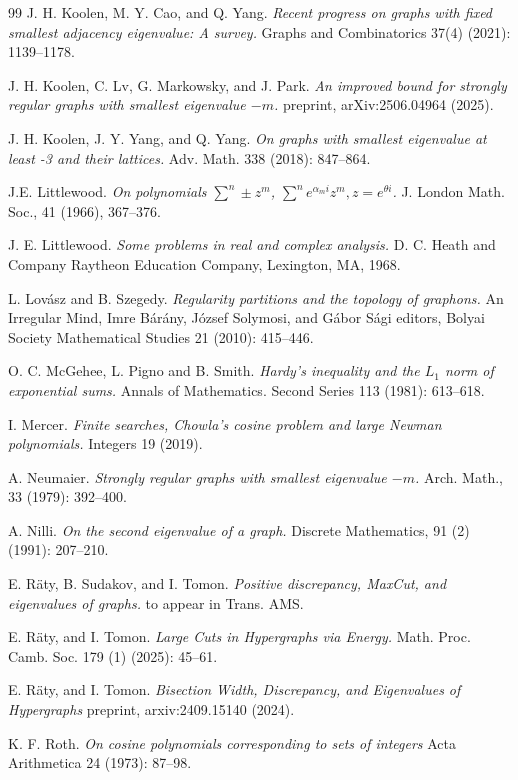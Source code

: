 \documentclass[11pt]{article}
\theoremstyle{plain}
\theoremstyle{definition}
\begin{document}
\begin{thebibliography}{99}
J. H. Koolen, M. Y. Cao, and Q. Yang.
\emph{Recent progress on graphs with fixed smallest adjacency eigenvalue: A survey.}
Graphs and Combinatorics 37(4) (2021): 1139--1178.

J. H. Koolen, C. Lv, G. Markowsky, and J. Park.
\emph{An improved bound for strongly regular graphs with smallest eigenvalue $-m$.} preprint, arXiv:2506.04964 (2025).

J. H. Koolen, J. Y. Yang, and Q. Yang.
\emph{On graphs with smallest eigenvalue at least -3 and their lattices.}
Adv. Math. 338 (2018): 847--864.

J.E. Littlewood.
\emph{On polynomials $\sum^n \pm z^m$, $\sum^n e^{\alpha_m i}z^m, z=e^{\theta i}$.}
J. London Math. Soc., 41 (1966), 367--376.

J. E. Littlewood.
\emph{Some problems in real and complex analysis.} 
D. C. Heath and Company Raytheon Education Company, Lexington, MA, 1968.

L. Lov\'asz and B. Szegedy.
\emph{Regularity partitions and the topology of graphons.}
An Irregular Mind, Imre B\'ar\'any, J\'ozsef Solymosi, and G\'abor S\'agi editors, Bolyai Society Mathematical Studies 21 (2010): 415--446.

O. C. McGehee, L. Pigno and B. Smith.
\emph{Hardy's inequality and the $L_1$ norm of exponential sums.}
Annals of Mathematics. Second Series 113 (1981): 613--618.

I. Mercer. 
\emph{Finite searches, Chowla's cosine problem and large Newman polynomials.}
Integers 19 (2019).

 A. Neumaier. 
\emph{Strongly regular graphs with smallest eigenvalue $-m$.} 
Arch. Math., 33 (1979): 392--400.

A. Nilli.
\emph{On the second eigenvalue of a graph.}
Discrete Mathematics, 91 (2) (1991): 207--210.

E. R\"aty, B. Sudakov, and I. Tomon.
\emph{Positive discrepancy, MaxCut, and eigenvalues of graphs.}
to appear in Trans. AMS.

E. R\"aty, and I. Tomon.
\emph{Large Cuts in Hypergraphs via Energy.}
Math. Proc. Camb. Soc. 179 (1) (2025): 45--61.

E. R\"aty, and I. Tomon.
\emph{Bisection Width, Discrepancy, and Eigenvalues of Hypergraphs}
preprint, arxiv:2409.15140 (2024).

K. F. Roth.
\emph{On cosine polynomials corresponding to sets of integers}
Acta Arithmetica 24 (1973): 87--98.


\end{thebibliography}
\end{document}
